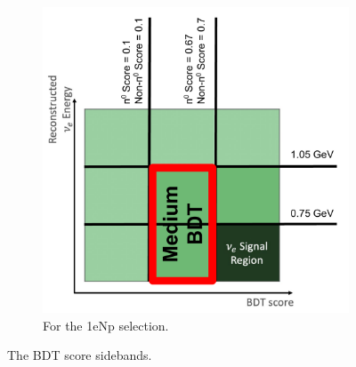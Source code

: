 \begin{figure}[H]
\begin{subfigure}{0.5\linewidth}
        \includegraphics[width=\linewidth]{technote/Sidebands/Figures/NearSideband/NpMediumBDTSideband.pdf}
        \caption{For the 1eNp selection.}
    \end{subfigure}
    \caption{The BDT score sidebands.}
    \label{fig:MediumBDTSideband}
\end{figure}


